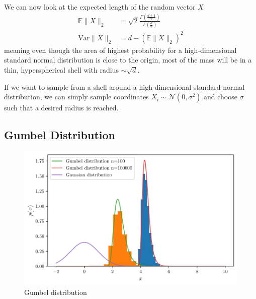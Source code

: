 We can now look at the expected length of the random vector $X$
\begin{equation}
	\begin{aligned}%
		\label{eq:mean_var_sq_dist}
		\mathbb{E} \lVert X \rVert_2   & = \sqrt{2} \frac{\Gamma(\frac{d +
		1}{2})}{\Gamma(\frac{d}{2})}                                            \\
		\mathrm{Var} \lVert X \rVert_2 & = d - (\mathbb{E} \lVert X \rVert_2)^2
	\end{aligned}
\end{equation}
meaning even though the area of highest probability for a high-dimensional
standard normal distribution is close to the origin, most of the mass will be
in a thin, hyperspherical shell with radius $\sim \sqrt{d}$.

If we want to sample from a shell around a high-dimensional standard normal
distribution, we can simply sample coordinates $X_i \sim \mathcal{N}(0,
	\sigma^2)$ and choose $\sigma$ such that a desired radius is reached.


\subsection{Gumbel Distribution}%
\label{sub:gumbel_distribution}

\begin{figure}[htpb]
	\centering
	\includegraphics{figures/samples/gumbel_uni.pdf}
	\caption{Gumbel distribution}%
	\label{fig:gumbel_uni}
\end{figure}

